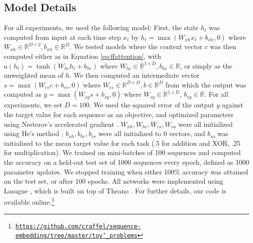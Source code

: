 \documentclass{article} %
\begin{document}
\subsection{Model Details}

For all experiments, we used the following model:
First, the state $h_t$ was computed from input at each time step $x_t$ by $h_t = \max(W_{xh}x_t + b_{xh}, 0)$ where $W_{xh} \in \mathbb{R}^{D \times 2}, b_{xh} \in \mathbb{R}^D$.
We tested models where the context vector $c$ was then computed either as in Equation \ref{eq:ffattention}, with $a(h_t) =\tanh(W_{hc}h_t + b_{hc})$ where $W_{hc} \in \mathbb{R}^{1 \times D}, b_{hc} \in \mathbb{R}$, or simply as the unweighted mean of $h$.
We then computed an intermediate vector $s = \max(W_{cs}c + b_{cs}, 0)$ where $W_{cs} \in \mathbb{R}^{D \times D}, b \in \mathbb{R}^D$ from which the output was computed as $y = \max(W_{sy}s + b_{sy}, 0)$ where $W_{sy} \in \mathbb{R}^{1 \times D}$, $b_{sy} \in \mathbb{R}$.
For all experiments, we set $D = 100$.
We used the squared error of the output $y$ against the target value for each sequence as an objective, and optimized parameters using Nesterov's accelerated gradient \cite{sutskever2013importance}.
$W_{xh}, W_{hc}, W_{cs}, W_{so}$ were all initialized using He's method \cite{he2015delving}; $b_{xh}, b_{hc}, b_{cs}$ were all initialized to 0 vectors, and $b_{so}$ was initialized to the mean target value for each task (.5 for addition and XOR, .25 for multiplication).
We trained on mini-batches of 100 sequences and computed the accuracy on a held-out test set of 1000 sequences every epoch, defined as 1000 parameter updates.
We stopped training when either 100\% accuracy was attained on the test set, or after 100 epochs.
All networks were implemented using Lasagne \cite{dieleman2015lasagne}, which is built on top of Theano \cite{bastien2012theano,bergstra2010theano}.
For further details, our code is available online.\footnote{\href{https://github.com/craffel/sequence-embedding/tree/master/toy_problems}{\texttt{https://github.com/craffel/sequence-embedding/tree/master/toy\char`_problems}}}
\end{document}
